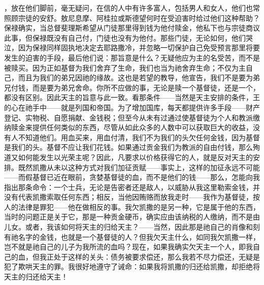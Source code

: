 ，放在他们脚前，毫无疑问，在信的人中有许多富人，包括男人和女人，他们也常照顾宗徒的安舒。敖尼息摩、阿桂拉或斯德望何时在受迫害时给过他们这种帮助？保禄确实，当总督斐理斯希望从门徒那里得到钱为他付赎金，他私下也与宗徒商议此事，但保禄既没有自己付，门徒也没有为他付。那些门徒，无论如何，他们哭泣，因为保禄同样固执地决定去耶路撒冷，并忽略一切保护自己免受预言那里将要发生的迫害的手段，最后他们说：那旨意是什么？无疑他应为主的名受苦，而不是被赎买。因为正如基督为我们舍弃了生命，我们也当为祂舍弃生命；不仅为主自己，而且为我们的弟兄因祂的缘故。这也是若望的教导，他宣告，我们不是要为弟兄付钱，而是要为弟兄舍命。你所不应做的事，无论是赎一个基督徒，还是一个，都没有区别。因此天主的旨意与此一致。看那条件——当然是天主安排的条件，王的心在祂手中——就是列国和帝国。为了增加国库，每天都提供许多手段——财产登记、实物税、自愿捐献、金钱税；但至今从未有过通过使基督徒为个人和教派缴纳赎金来提供任何类似的东西，尽管从如此众多的人数中可以获取巨大的收益，没有人不知道他们。用血买来，用血付清，我们不为我们的头欠任何金钱，因为基督是我们的头。基督不应让我们花钱。如果通过贡金我们为教派的自由付钱，那么殉道又如何能发生以光荣主呢？因此，凡要求以价格获得它的人，就是反对天主的安排。既然凯撒从未以这种方式对我们加征贡赋——事实上，这样的加征永远不可能——而假基督已近在眼前，贪婪基督徒的血，而不是他们的钱——那么，怎能向我指出那条命令：一个士兵，无论是告密者还是敌人，以威胁从我这里勒索金钱，并没有代表凯撒索取任何东西；相反，当他因贿赂而放我走时——我作为基督徒，按人的法律是罪犯——他在做相反的事。我欠凯撒的是另一种，它是属于他的东西，当时的问题正是关于它，那是一种贡金硬币，确实应由该纳税的人缴纳，而不是由儿女。或者，我该如何将天主的归给天主？——当然，因此那是祂自己的肖像和刻有祂名字的金钱，也就是一个基督徒的人？但我欠天主什么，如同我欠凯撒一样，岂不就是祂自己的儿子为我所流的血吗？现在，如果我确实欠天主一个人，即我自己的血，但我正处于这样的关头：债务被要求偿还，那么我若不尽力偿还，无疑是犯了欺哄天主的罪。我很好地遵守了诫命：如果我将凯撒的归还给凯撒，却拒绝将天主的归还给天主！\par

